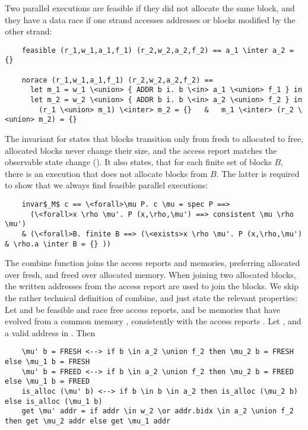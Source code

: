 \documentclass[a4paper,UKenglish,cleveref, autoref, thm-restate]{lipics-v2021}
\begin{document}
  Two parallel executions are feasible if they did not allocate the same block, and they have a data race
  if one strand accesses addresses or blocks modified by the other strand:
  \begin{lstlisting}
    feasible (r_1,w_1,a_1,f_1) (r_2,w_2,a_2,f_2) == a_1 \inter a_2 = {}

    norace (r_1,w_1,a_1,f_1) (r_2,w_2,a_2,f_2) ==
      let m_1 = w_1 \<union> { ADDR b i. b \<in> a_1 \<union> f_1 } in
      let m_2 = w_2 \<union> { ADDR b i. b \<in> a_2 \<union> f_2 } in
        (r_1 \<union> m_1) \<inter> m_2 = {}   &   m_1 \<inter> (r_2 \<union> m_2) = {}
  \end{lstlisting}
  The invariant for  states that blocks transition only from fresh to allocated to free,
  allocated blocks never change their size, and the access report matches the observable state change ().
  It also states, that for each finite set of blocks $B$, there is an execution that does not allocate blocks from $B$.
  The latter is required to show that we always find feasible parallel executions:
  \begin{lstlisting}
    invar$_M$ c == \<forall>\mu P. c \mu = spec P ==>
      (\<forall>x \rho \mu'. P (x,\rho,\mu') ==> consistent \mu \rho \mu')
    & (\<forall>B. finite B ==> (\<exists>x \rho \mu'. P (x,\rho,\mu') & \rho.a \inter B = {} ))
  \end{lstlisting}
  The combine function joins the access reports and memories,
  preferring allocated over fresh, and freed over allocated memory. When joining two allocated blocks, the written addresses
  from the access report are used to join the blocks. We skip the rather technical definition of combine, and just state the
  relevant properties: Let  and  be feasible and race free access reports,
  and  be memories that have evolved from a common memory \is{\mu}, consistently with
  the access reports . Let , and  a valid address in . Then
  \begin{lstlisting}
    \mu' b = FRESH <--> if b \in a_2 \union f_2 then \mu_2 b = FRESH else \mu_1 b = FRESH
    \mu' b = FREED <--> if b \in a_2 \union f_2 then \mu_2 b = FREED else \mu_1 b = FREED
    is_alloc (\mu' b) <--> if b \in b \in a_2 then is_alloc (\mu_2 b) else is_alloc (\mu_1 b)
    get \mu' addr = if addr \in w_2 \or addr.bidx \in a_2 \union f_2 then get \mu_2 addr else get \mu_1 addr
  \end{lstlisting}
\end{document}
